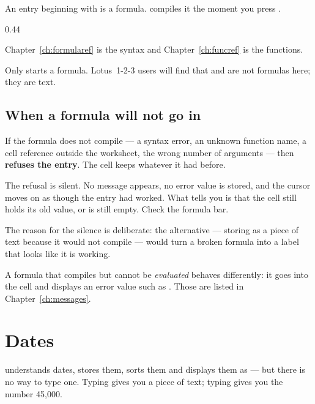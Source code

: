 An entry beginning with \lit{=} is a formula. \ccprod{} compiles it the moment
you press .

\begin{ccexamples}{0.44\linewidth}
\end{ccexamples}

Chapter~\ref{ch:formularef} is the syntax and Chapter~\ref{ch:funcref} is the functions.

\begin{ccnote}
Only \lit{=} starts a formula. Lotus~1-2-3 users will find that  and
 are not formulas here; they are text.
\end{ccnote}

\subsection{When a formula will not go in}

If the formula does not compile --- a syntax error, an unknown function name, a
cell reference outside the worksheet, the wrong number of arguments --- then
\ccprod{} \textbf{refuses the entry}. The cell keeps whatever it had before.

\begin{cccaution}
The refusal is silent. No message appears, no error value is stored, and the
cursor moves on as though the entry had worked. What tells you is that the cell
still holds its old value, or is still empty. Check the formula bar.

The reason for the silence is deliberate: the alternative --- storing
 as a piece of text because it would not compile --- would turn
a broken formula into a label that looks like it is working.
\end{cccaution}

A formula that compiles but cannot be \emph{evaluated} behaves differently: it
goes into the cell and displays an error value such as . Those
are listed in Chapter~\ref{ch:messages}.

\section{Dates}

\ccprod{} understands dates, stores them, sorts them and displays them as
 --- but there is no way to type one. Typing 
gives you a piece of text; typing  gives you the number 45,000.

